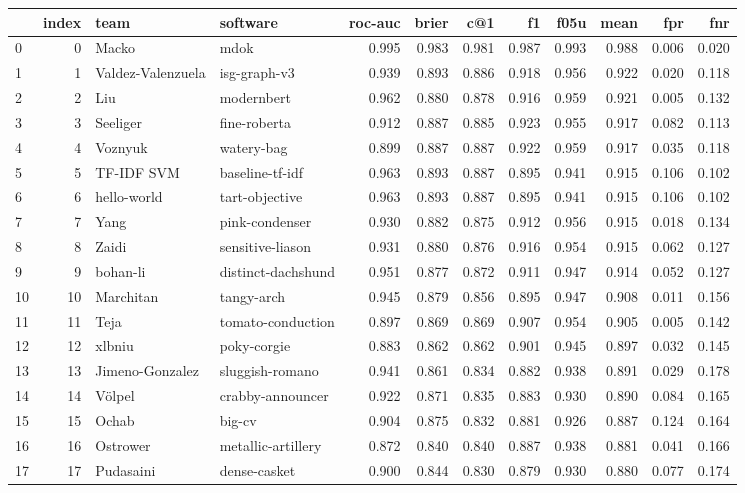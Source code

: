 \begin{tabular}{lrllrrrrrrrr}
\toprule
 & index & team & software & roc-auc & brier & c@1 & f1 & f05u & mean & fpr & fnr \\
\midrule
0 & 0 & Macko & mdok & 0.995 & 0.983 & 0.981 & 0.987 & 0.993 & 0.988 & 0.006 & 0.020 \\
1 & 1 & Valdez-Valenzuela & isg-graph-v3 & 0.939 & 0.893 & 0.886 & 0.918 & 0.956 & 0.922 & 0.020 & 0.118 \\
2 & 2 & Liu & modernbert & 0.962 & 0.880 & 0.878 & 0.916 & 0.959 & 0.921 & 0.005 & 0.132 \\
3 & 3 & Seeliger & fine-roberta & 0.912 & 0.887 & 0.885 & 0.923 & 0.955 & 0.917 & 0.082 & 0.113 \\
4 & 4 & Voznyuk & watery-bag & 0.899 & 0.887 & 0.887 & 0.922 & 0.959 & 0.917 & 0.035 & 0.118 \\
5 & 5 & TF-IDF SVM & baseline-tf-idf & 0.963 & 0.893 & 0.887 & 0.895 & 0.941 & 0.915 & 0.106 & 0.102 \\
6 & 6 & hello-world & tart-objective & 0.963 & 0.893 & 0.887 & 0.895 & 0.941 & 0.915 & 0.106 & 0.102 \\
7 & 7 & Yang & pink-condenser & 0.930 & 0.882 & 0.875 & 0.912 & 0.956 & 0.915 & 0.018 & 0.134 \\
8 & 8 & Zaidi & sensitive-liason & 0.931 & 0.880 & 0.876 & 0.916 & 0.954 & 0.915 & 0.062 & 0.127 \\
9 & 9 & bohan-li & distinct-dachshund & 0.951 & 0.877 & 0.872 & 0.911 & 0.947 & 0.914 & 0.052 & 0.127 \\
10 & 10 & Marchitan & tangy-arch & 0.945 & 0.879 & 0.856 & 0.895 & 0.947 & 0.908 & 0.011 & 0.156 \\
11 & 11 & Teja & tomato-conduction & 0.897 & 0.869 & 0.869 & 0.907 & 0.954 & 0.905 & 0.005 & 0.142 \\
12 & 12 & xlbniu & poky-corgie & 0.883 & 0.862 & 0.862 & 0.901 & 0.945 & 0.897 & 0.032 & 0.145 \\
13 & 13 & Jimeno-Gonzalez & sluggish-romano & 0.941 & 0.861 & 0.834 & 0.882 & 0.938 & 0.891 & 0.029 & 0.178 \\
14 & 14 & Völpel & crabby-announcer & 0.922 & 0.871 & 0.835 & 0.883 & 0.930 & 0.890 & 0.084 & 0.165 \\
15 & 15 & Ochab & big-cv & 0.904 & 0.875 & 0.832 & 0.881 & 0.926 & 0.887 & 0.124 & 0.164 \\
16 & 16 & Ostrower & metallic-artillery & 0.872 & 0.840 & 0.840 & 0.887 & 0.938 & 0.881 & 0.041 & 0.166 \\
17 & 17 & Pudasaini & dense-casket & 0.900 & 0.844 & 0.830 & 0.879 & 0.930 & 0.880 & 0.077 & 0.174 \\

\end{tabular}
